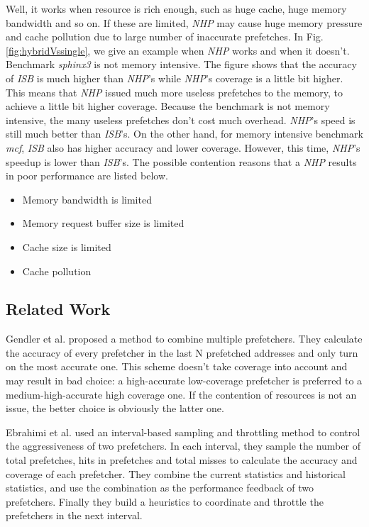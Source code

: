   Well, it works when resource is rich enough, such as huge cache, huge memory bandwidth and so on. If these are limited, \emph{NHP} may cause huge memory pressure and cache pollution due to large number of inaccurate prefetches. In Fig.\ref{fig:hybridVssingle}, we give an example when \emph{NHP} works and when it doesn't. 
 Benchmark \emph{sphinx3} is not memory intensive. The figure shows that the accuracy of \emph{ISB} is much higher than \emph{NHP}'s while \emph{NHP}'s coverage is a little bit higher. This means that \emph{NHP} issued much more useless prefetches to the memory, to achieve a little bit higher coverage. Because the benchmark is not memory intensive, the many useless prefetches don't cost much overhead. \emph{NHP}'s speed is still much better than \emph{ISB}'s. 
 On the other hand, for memory intensive benchmark \emph{mcf}, \emph{ISB} also has higher accuracy and lower coverage. However, this time, \emph{NHP}'s speedup is lower than \emph{ISB}'s. The possible contention reasons that a \emph{NHP} results in poor performance are listed below.


  \begin{itemize}
    \item Memory bandwidth is limited
    \item Memory request buffer size is limited
    \item Cache size is limited
    \item Cache pollution
  \end{itemize}

  \subsection{Related Work}
  \label{sec:PrevSol}
  Gendler et al.\cite{gendlerpaper} proposed a method to combine multiple prefetchers.
  They calculate the accuracy of every prefetcher in the last N prefetched addresses and only turn on the most accurate one.
  This scheme doesn't take coverage into account and may result in bad choice: a high-accurate low-coverage prefetcher is preferred to a medium-high-accurate high coverage one.
  If the contention of resources is not an issue, the better choice is obviously the latter one. \par
  Ebrahimi et al.\cite{yalepaper} used an interval-based sampling and throttling method to control the aggressiveness of two prefetchers.
  In each interval, they sample the number of total prefetches, hits in prefetches and total misses to calculate the accuracy and coverage of each prefetcher.
  They combine the current statistics and historical statistics, and use the combination as the performance feedback of two prefetchers.
  Finally they build a heuristics to coordinate and throttle the prefetchers in the next interval.



